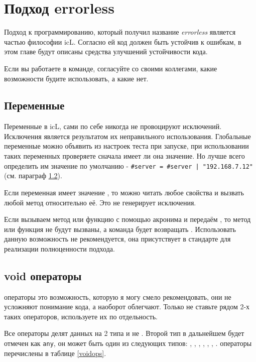
\section{Подход errorless}

\label{errorless-sec}

Подход к программированию, который получил название \textit{errorless} является частью философии icL. Согласно ей код должен быть устойчив к ошибкам, в этом главе будут описаны средства улучшений устойчивости кода.

Если вы работаете в команде, согласуйте со своими коллегами, какие возможности будите использовать, а какие нет.

\subsection{Переменные}

Переменные в icL, сами по себе никогда не провоцируют исключений. Исключения является результатом их неправильного использования. Глобальные переменные можно объявить из настроек теста при запуске, при использовании таких переменных проверяете сначала имеет ли она значение. Но лучше всего определить им значение по умолчанию - \texttt{#server = #server | "192.168.7.12"} (см. параграф \ref{void-operators}).

Если переменная имеет значение \void, то можно читать любое свойства и вызвать любой метод относительно её. Это не генерирует исключения.

Если вызываем метод или функцию с помощью акронима и передаём \void, то метод или функция не будут вызваны, а команда будет возвращать \void. Использовать данную возможность не рекомендуется, она присутствует в стандарте для реализации полноценности подхода.

\subsection{{\color{lightblue}void} операторы}

\label{void-operators}

\void{} операторы это возможность, которую я могу смело рекомендовать, они не усложняют понимание кода, а наоборот облегчают. Только не ставьте рядом 2-х таких операторов, используете их по отдельность.

Все \void{} операторы делят данных на 2 типа \void{} и не \void{}. Второй тип в дальнейшем будет отмечен как \texttt{any}, он может быть один из следующих типов: \integer{}, \double{}, \str{}, \listtype{}, \object{}, \set{}, \element{}. \void{} операторы перечислены в таблице \ref{voidops}.

